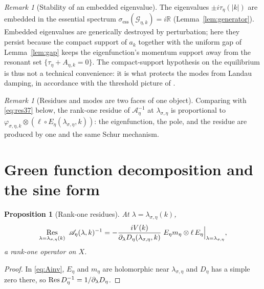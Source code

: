 \documentclass[11pt,a4paper]{amsart}
\newtheorem{proposition}[theorem]{Proposition}
\theoremstyle{definition}
\theoremstyle{remark}
\newtheorem{remark}[theorem]{Remark}
\newcommand{\R}{\mathbb{R}}
\newcommand{\Res}{\operatornamewithlimits{Res}}
\newcommand{\ellf}{\ell}
\newcommand{\sA}{\mathscr{A}}
\newcommand{\sG}{\mathcal{G}}
\begin{document}
\begin{remark}[Stability of an embedded eigenvalue]\label{rem:embedded}
The eigenvalues $\pm i\tau_\eta(|k|)$ are embedded in the essential spectrum $\sigma_{\mathrm{ess}}(\sG_{\eta,k})=i\R$ (Lemma~\ref{lem:generator}). Embedded eigenvalues are generically destroyed by perturbation; here they persist because the compact support of $a_k$ together with the uniform gap of Lemma~\ref{lem:gap} keeps the eigenfunction's momentum support away from the resonant set $\{\tau_\eta+A_{\eta,k}=0\}$. The compact-support hypothesis on the equilibrium is thus not a technical convenience: it is what protects the modes from Landau damping, in accordance with the threshold picture of \cite{NY1,NguyenJFA}.
\end{remark}

\begin{remark}[Residues and modes are two faces of one object]\label{rem:rankone}
Comparing with \eqref{eq:res37} below, the rank-one residue of $\sA_\eta^{-1}$ at $\lambda_{\sigma,\eta}$ is proportional to $\varphi_{\sigma,\eta,k}\otimes(\ellf\circ E_\eta(\lambda_{\sigma,\eta},k))$: the eigenfunction, the pole, and the residue are produced by one and the same Schur mechanism.
\end{remark}

\section{Green function decomposition and the sine form}\label{sec:green}

\begin{proposition}[Rank-one residues]\label{prop:res}
At $\lambda=\lambda_{\sigma,\eta}(k)$,
\begin{equation}\label{eq:res37}
\Res_{\lambda=\lambda_{\sigma,\eta}(k)}\ \sA_\eta(\lambda,k)^{-1}
=-\frac{iV(k)}{\partial_\lambda D_\eta(\lambda_{\sigma,\eta},k)}\;
E_\eta m_\eta\otimes\ellf\,E_\eta\Big|_{\lambda=\lambda_{\sigma,\eta}},
\end{equation}
a rank-one operator on $X$.
\end{proposition}

\begin{proof}
In \eqref{eq:Ainv}, $E_\eta$ and $m_\eta$ are holomorphic near $\lambda_{\sigma,\eta}$ and $D_\eta$ has a simple zero there, so $\Res D_\eta^{-1}=1/\partial_\lambda D_\eta$.
\end{proof}
\end{document}
